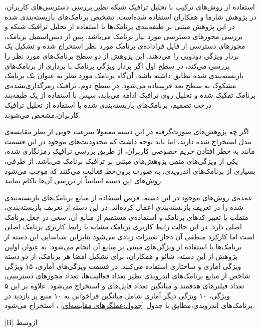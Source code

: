 استفاده از روش‌های ترکیب با تحلیل ترافیک شبکه نظیر بررسی دسترسی‌های کاربران، در پژوهش شارما و همکاران  استفاده شده‌است. تشخیص برنامک‌های بازبسته‌بندی شده در این پژوهش مبتنی بر طبقه‌بندی برنامک‌ها با استفاده از تحلیل ترافیک شبکه و بررسی مجوز‌های دسترسی مورد نیاز برنامک می‌باشد. پس از دیس‌اسمبل برنامک، مجوز‌های دسترسی از فایل فراداده‌ی‌ برنامک مورد نظر استخراج شده و تشکیل یک بردار ویژگی دودویی را می‌دهند. این پژوهش از دو سطح برنامک‌های مورد نظر را بررسی می‌کند، در سطح اول اگر بردار ویژگی برنامک با برداری از برنامک‌های بازبسته‌بندی شده تطابق داشته باشد، آن‌گاه برنامک مورد نظر به عنوان یک برنامک مشکوک به سطح بعد فرستاده می‌شود. در سطح دوم، ترافیک رمزگذاری‌نشده‌‌ی برنامک تفکیک شده و تحلیل روی ترافیک  ادامه می‌یابد، سپس با استفاده از یک طبقه‌بند درخت تصمیم‌، برنامک‌های بازبسته‌بندی شده با استفاده از تحلیل ترافیک کاربران،‌مشخص می‌شوند.

اگر چه پژوهش‌های صورت‌گرفته در این دسته معمولا سرعت خوبی از نظر مقایسه‌ی مدل استخراج شده‌ دارند، اما باید توجه داشت که محدودیت‌های موجود در این قسمت مانند به خطر افتادن حریم خصوصی کاربران، از طریق بررسی ترافیک رمز‌نگاری شده، یکی از ویژگی‌های منفی پژوهش‌های مبتنی بر ترافیک برنامک می‌باشد. از طرفی، بسیاری از برنامک‌های اندرویدی، به صورت برون‌خط فعالیت می‌کنند که موجب می‌شود روش‌های این دسته اساساً از بررسی آن‌ها ناکام بمانند.


عمده‌ی روش‌های موجود در این دسته، فرض استفاده از منابع برنامک‌های بازبسته‌بندی شده را در تعریف بازبسته‌بندی اعمال کرده‌اند. در این دسته از تعریف بازبسته‌بندی، متقلب با تغییر کد‌های برنامک و استفاده‌ی مستقیم از منابع آن، سعی در جعل برنامک اصلی دارد. در این حالت رابط کاربری برنامک مشابه با رابط کاربری برنامک اصلی است اما کارکرد منطقی آن دجار تغییرات زیادی می‌شود بنابراین شناسایی این دسته از برنامک‌ها با استفاده از ویژگی‌های مبتنی بر منابع آن انجام می‌شود. به عنوان اولین پژوهش از این دسته، شائو و همکاران، برای تشکیل امضا هر برنامک، از دو دسته ویژگی آماری‌ و ساختاری‌ استفاده می‌کنند. در قسمت ویژگی‌های آماری، ۱۵ ویژگی شاخص از منابع برنامک‌های اندرویدی نظیر تعداد فعالیت‌ها‌، تعداد مجوز‌های دسترسی، تعداد فیلتر‌های هدفمند‌ و میانگین تعداد فایل‌های  و  استخراج می‌شود. علاوه بر این ۵ ویژگی، ۱۰ ویژگی دیگر آماری شامل میانگین فراخوانی به ۱۰ منبع پر بازدید در برنامک‌های اندرویدی،مطابق با جدول
\ref{جدول:عملگرهای مقایسه‌ای}
، استخراج می‌شود.

[H]
‌ازوسط

